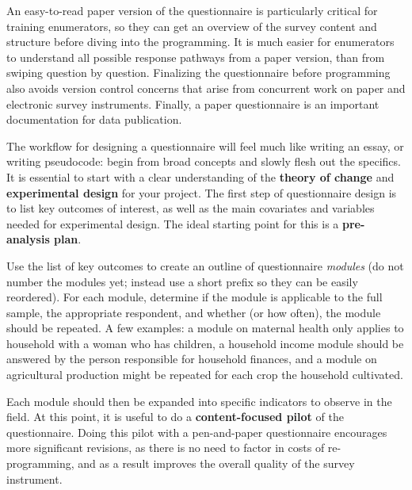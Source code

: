 An easy-to-read paper version of the questionnaire is particularly critical for training enumerators, so they can get an overview of the survey content and structure before diving into the programming.
It is much easier for enumerators to understand all possible response pathways from a paper version, than from swiping question by question.
Finalizing the questionnaire before programming also avoids version control concerns that arise from concurrent work on paper and electronic survey instruments.
Finally, a paper questionnaire is an important documentation for data publication.

The workflow for designing a questionnaire will feel much like writing an essay, or writing pseudocode: begin from broad concepts and slowly flesh out the specifics. It is essential to start with a clear understanding of the
\textbf{theory of change}  and \textbf{experimental design} for your project.
The first step of questionnaire design is to list key outcomes of interest, as well as the main covariates and variables needed for experimental design.
The ideal starting point for this is a \textbf{pre-analysis plan}. 

Use the list of key outcomes to create an outline of questionnaire \textit{modules} (do not number the modules yet; instead use a short prefix so they can be easily reordered). For each module, determine if the module is applicable to the full sample, the appropriate respondent, and whether (or how often), the module should be repeated. A few examples: a module on maternal health only applies to household with a woman who has children, a household income module should be answered by the person responsible for household finances, and a module on agricultural production might be repeated for each crop the household cultivated.

Each module should then be expanded into specific indicators to observe in the field. 
At this point, it is useful to do a  \textbf{content-focused pilot}  of the questionnaire.
Doing this pilot with a pen-and-paper questionnaire encourages more significant revisions, as there is no need to factor in costs of re-programming, and as a result improves the overall quality of the survey instrument.

